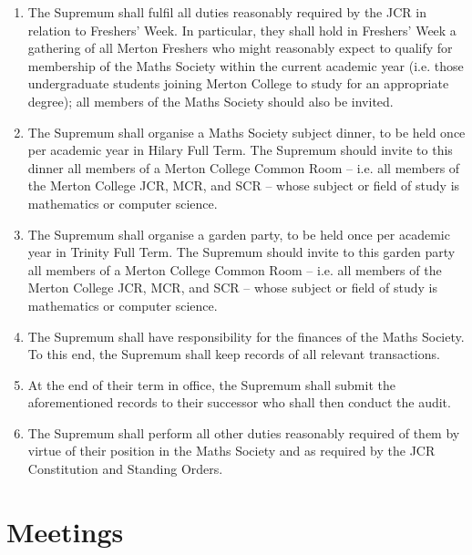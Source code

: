 \documentclass[pdftex,a4paper]{report}
\begin{document}
\begin{enumerate}[label=\Roman*)]
	\item The Supremum shall fulfil all duties reasonably required by the JCR in relation to Freshers' Week. In particular, they shall hold in Freshers' Week a gathering of all Merton Freshers who might reasonably expect to qualify for membership of the Maths Society within the current academic year (i.e. those undergraduate students joining Merton College to study for an appropriate degree); all members of the Maths Society should also be invited.
	\item The Supremum shall organise a Maths Society subject dinner, to be held once per academic year in Hilary Full Term. The Supremum should invite to this dinner all members of a Merton College Common Room -- i.e. all members of the Merton College JCR, MCR, and SCR -- whose subject or field of study is mathematics or computer science.
	\item The Supremum shall organise a garden party, to be held once per academic year in Trinity Full Term. The Supremum should invite to this garden party all members of a Merton College Common Room -- i.e. all members of the Merton College JCR, MCR, and SCR -- whose subject or field of study is mathematics or computer science.
	\item The Supremum shall have responsibility for the finances of the Maths Society. To this end, the Supremum shall keep records of all relevant transactions.
	\item At the end of their term in office, the Supremum shall submit the aforementioned records to their successor who shall then conduct the audit.
	\item The Supremum shall perform all other duties reasonably required of them by virtue of their position in the Maths Society and as required by the JCR Constitution and Standing Orders.
\end{enumerate}


\section*{Meetings}
\end{document}
